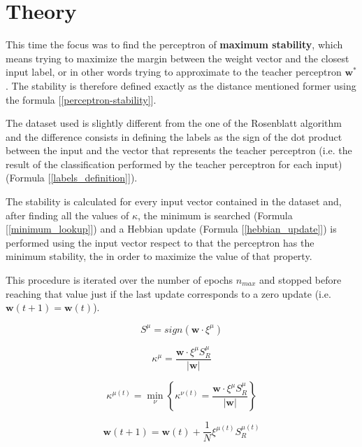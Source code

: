 \section{Theory}
\label{sec:theory}

This time the focus was to find the perceptron of \textbf{maximum stability}, which means trying to maximize the margin between the
weight vector and the closest input label, or in other words trying to approximate to the teacher perceptron $\mathsf{\textbf{w}}^*$.
The stability is therefore defined exactly as the distance mentioned former using the formula [\ref{perceptron-stability}].

The dataset used is slightly different from the one of the Rosenblatt algorithm and the difference consists in defining the labels
as the sign of the dot product between the input and the vector that represents the teacher perceptron (i.e. the result of the
classification performed by the teacher perceptron for each input) (Formula [\ref{labels_definition}]). 

The stability is calculated for every input vector contained in the dataset and, after finding all the values of $\kappa$,
the minimum is searched (Formula [\ref{minimum_lookup}]) and a Hebbian update (Formula [\ref{hebbian_update}]) is performed using the input vector
respect to that the perceptron has the minimum stability, the in order to maximize the value of that property.

This procedure is iterated over the number of epochs $n_{max}$ and stopped before reaching that value just if the last update
corresponds to a zero update (i.e. $\mathsf{\bm{w}}(t+1) = \mathsf{\bm{w}}(t)$). 

\begin{equation} \label{eq:labels_definition}
    S^\mu = sign(\mathsf{\bm{w}} \cdotp \xi^\mu)
\end{equation}

\begin{equation} \label{eq:perceptron-stability}
    \kappa^\mu = \frac{\mathsf{\bm{w}} \cdotp \xi^\mu S^\mu_R}{\lvert \mathsf{\bm{w}} \rvert}
\end{equation}

\begin{equation} \label{vminimum_lookup}
    \kappa^{\mu(t)} = \min_\nu \left \{ \kappa^{\nu(t)} =  \frac{\mathsf{\bm{w}} \cdotp \xi^\mu S^\mu_R}{\lvert \mathsf{\bm{w}} \rvert} \right \}
\end{equation}

\begin{equation} \label{eq:hebbian_update}
    \mathsf{\bm{w}}(t+1) = \mathsf{\bm{w}}(t) + \frac{1}{N} \xi^{\mu(t)} S^{\mu(t)}_R
\end{equation}
